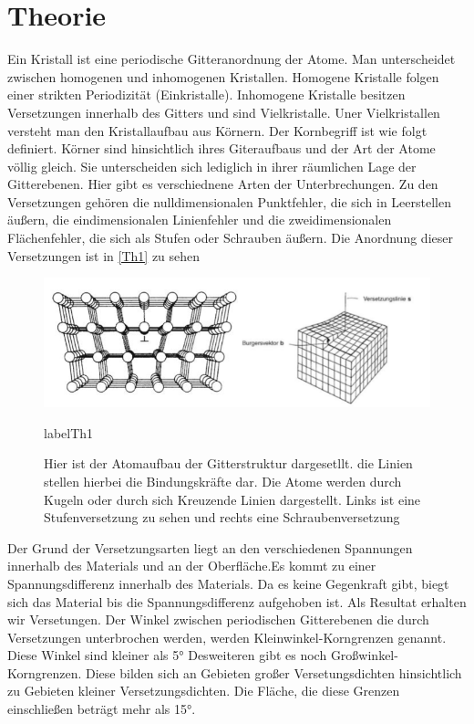 \documentclass[
	a4paper,
	12pt,
	pagesize,
	ngerman
]{scrartcl}
\begin{document}
\section{Theorie}
Ein Kristall ist eine periodische Gitteranordnung der Atome. Man unterscheidet zwischen homogenen und inhomogenen Kristallen. Homogene Kristalle folgen einer strikten Periodizität (Einkristalle). Inhomogene Kristalle besitzen Versetzungen innerhalb des Gitters und sind Vielkristalle. Uner Vielkristallen versteht man den Kristallaufbau aus Körnern. Der Kornbegriff ist wie folgt definiert. Körner sind hinsichtlich ihres Giteraufbaus und der Art der Atome völlig gleich. Sie unterscheiden sich lediglich in ihrer räumlichen Lage der Gitterebenen. Hier gibt es verschiednene Arten der Unterbrechungen. Zu den Versetzungen gehören die nulldimensionalen Punktfehler, die sich in Leerstellen äußern, die eindimensionalen Linienfehler und die zweidimensionalen Flächenfehler, die sich als Stufen oder Schrauben äußern. Die Anordnung dieser Versetzungen ist in \cref{Th1} zu sehen
\begin{figure}[h]
	\centering
	\includegraphics[scale=0.6]{theorie.png}
	\caption{Hier ist der Atomaufbau der Gitterstruktur dargesetllt. die Linien stellen hierbei die Bindungskräfte dar. Die Atome werden durch Kugeln oder durch sich Kreuzende Linien dargestellt.	Links ist eine Stufenversetzung zu sehen und rechts eine Schraubenversetzung}
	label{Th1}
\end{figure}
Der Grund der Versetzungsarten liegt an den verschiedenen Spannungen innerhalb des Materials und an der Oberfläche.Es kommt zu einer Spannungsdifferenz innerhalb des Materials. Da es keine Gegenkraft gibt, biegt sich das Material bis die Spannungsdifferenz aufgehoben ist. Als Resultat erhalten wir Versetungen. Der Winkel zwischen periodischen Gitterebenen die durch Versetzungen unterbrochen werden, werden Kleinwinkel-Korngrenzen genannt. Diese Winkel sind kleiner als 5°
Desweiteren gibt es noch Großwinkel-Korngrenzen. Diese bilden sich an Gebieten großer Versetungsdichten hinsichtlich zu Gebieten kleiner Versetzungsdichten. Die Fläche, die diese Grenzen einschließen beträgt mehr als 15°. 
\end{document}
